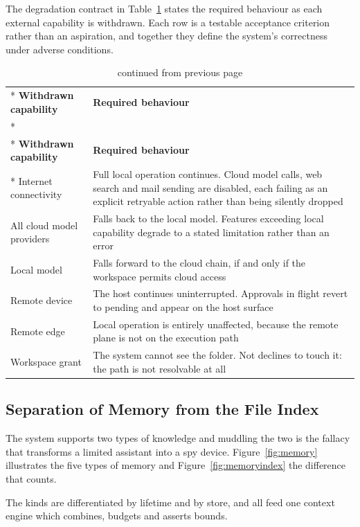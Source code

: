 \documentclass{FastFyp}
\begin{document}
The degradation contract in Table~\ref{tab:degradation} states the required behaviour as each external capability is withdrawn. Each row is a testable acceptance criterion rather than an aspiration, and together they define the system's correctness under adverse conditions.

{\small
{}
\begin{longtable}{|p{4.6cm}|p{8.6cm}|}
\caption{The degradation contract.}\label{tab:degradation}\\*
\hline
\textbf{Withdrawn capability} & \textbf{Required behaviour} \\*
\hline
\endfirsthead
\caption[]{continued from previous page}\\*
\hline
\textbf{Withdrawn capability} & \textbf{Required behaviour} \\*
\hline
\endhead
\hline
Internet connectivity & Full local operation continues. Cloud model calls, web search and mail sending are disabled, each failing as an explicit retryable action rather than being silently dropped \\
\hline
All cloud model providers & Falls back to the local model. Features exceeding local capability degrade to a stated limitation rather than an error \\
\hline
Local model & Falls forward to the cloud chain, if and only if the workspace permits cloud access \\
\hline
Remote device & The host continues uninterrupted. Approvals in flight revert to pending and appear on the host surface \\
\hline
Remote edge & Local operation is entirely unaffected, because the remote plane is not on the execution path \\
\hline
Workspace grant & The system cannot see the folder. Not declines to touch it: the path is not resolvable at all \\
\hline
\end{longtable}
}

\subsection{Separation of Memory from the File Index}
The system supports two types of knowledge and muddling the two is the fallacy that transforms a limited assistant into a spy device. Figure~\ref{fig:memory} illustrates the five types of memory and Figure~\ref{fig:memoryindex} the difference that counts.


The kinds are differentiated by lifetime and by store, and all feed one context engine which combines, budgets and asserts bounds.
\end{document}
